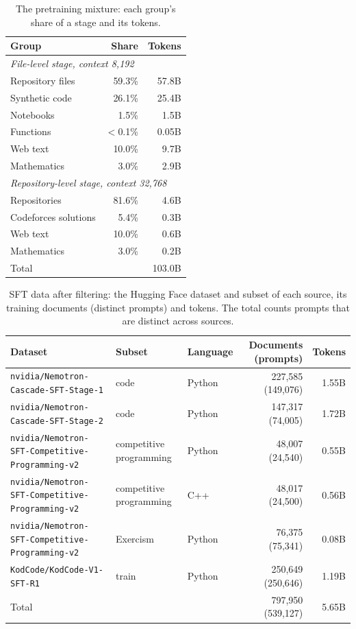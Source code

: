 \documentclass[sigconf,nonacm,balance=false]{acmart}
\begin{document}
\begin{table}
  \caption{The pretraining mixture: each group's share of a stage and its tokens.}
  \label{tab:mixture}
  \small
  \begin{tabular}{lrr}
    \toprule
    Group & Share & Tokens \\
    \midrule
    \multicolumn{3}{l}{\emph{File-level stage, context 8,192}} \\
    Repository files & 59.3\% & 57.8B \\
    Synthetic code & 26.1\% & 25.4B \\
    Notebooks & 1.5\% & 1.5B \\
    Functions & $<$0.1\% & 0.05B \\
    Web text & 10.0\% & 9.7B \\
    Mathematics & 3.0\% & 2.9B \\
    \midrule
    \multicolumn{3}{l}{\emph{Repository-level stage, context 32,768}} \\
    Repositories & 81.6\% & 4.6B \\
    Codeforces solutions & 5.4\% & 0.3B \\
    Web text & 10.0\% & 0.6B \\
    Mathematics & 3.0\% & 0.2B \\
    \midrule
    Total & & 103.0B \\
    \bottomrule
  \end{tabular}
\end{table}

\begin{table}
  \caption{SFT data after filtering: the Hugging Face dataset and subset of each source, its training documents
  (distinct prompts) and tokens. The total counts prompts that are distinct across sources.}
  \label{tab:sft}
  \small
  \begin{tabular}{lllrr}
    \toprule
    Dataset & Subset & Language & Documents (prompts) & Tokens \\
    \midrule
    \texttt{nvidia/Nemotron-Cascade-SFT-Stage-1} & code & Python & 227,585 (149,076) & 1.55B \\
    \texttt{nvidia/Nemotron-Cascade-SFT-Stage-2} & code & Python & 147,317 (74,005) & 1.72B \\
    \texttt{nvidia/Nemotron-SFT-Competitive-Programming-v2} & competitive programming & Python & 48,007 (24,540) & 0.55B \\
    \texttt{nvidia/Nemotron-SFT-Competitive-Programming-v2} & competitive programming & C++ & 48,017 (24,500) & 0.56B \\
    \texttt{nvidia/Nemotron-SFT-Competitive-Programming-v2} & Exercism & Python & 76,375 (75,341) & 0.08B \\
    \texttt{KodCode/KodCode-V1-SFT-R1} & train & Python & 250,649 (250,646) & 1.19B \\
    \midrule
    Total & & & 797,950 (539,127) & 5.65B \\
    \bottomrule
  \end{tabular}
\end{table}
\end{document}
